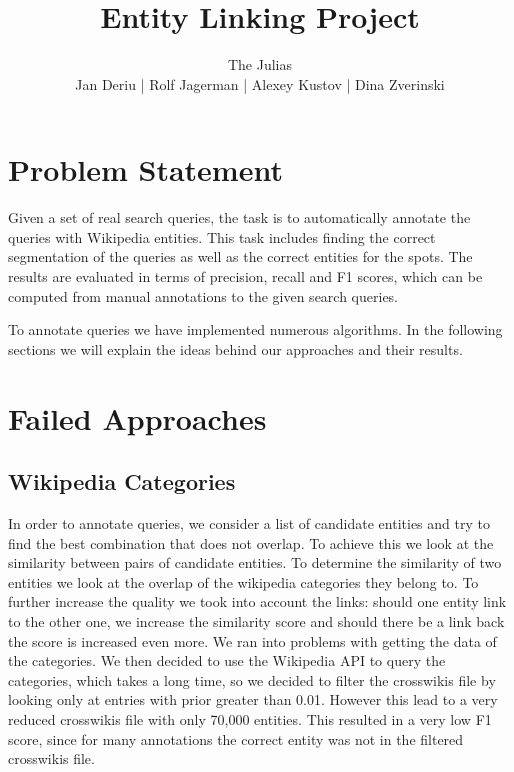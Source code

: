 \documentclass[a4paper,10pt,twocolumn]{article}
\title{Entity Linking Project}
\author{\Large{The Julias}\\Jan Deriu | Rolf Jagerman | Alexey Kustov | Dina Zverinski}
\begin{document}
\maketitle

\section{Problem Statement}
Given a set of real search queries, the task is to automatically annotate the queries with Wikipedia entities. This task includes finding the correct segmentation of the queries as well as the correct entities for the spots. The results are evaluated in terms of precision, recall and F1 scores, which can be computed from manual annotations to the given search queries.

To annotate queries we have implemented numerous algorithms. In the following sections we will explain the ideas behind our approaches and their results.

\section{Failed Approaches}

\subsection{Wikipedia Categories}
In order to annotate queries, we consider a list of candidate entities and try to find the best combination that does not overlap. To achieve this we look at the similarity between pairs of candidate entities. To determine the similarity of two entities we look at the overlap of the wikipedia categories they belong to. To further increase the quality we took into account the links: should one entity link to the other one, we increase the similarity score and should there be a link back the score is increased even more.
We ran into problems with getting the data of the categories. We then decided to use the Wikipedia API to query the categories, which takes a long time, so we decided to filter the crosswikis file by looking only at entries with prior greater than 0.01. However this lead to a very reduced crosswikis file with only 70,000 entities.
This resulted in a very low F1 score, since for many annotations the correct entity was not in the filtered crosswikis file.  
\end{document}
